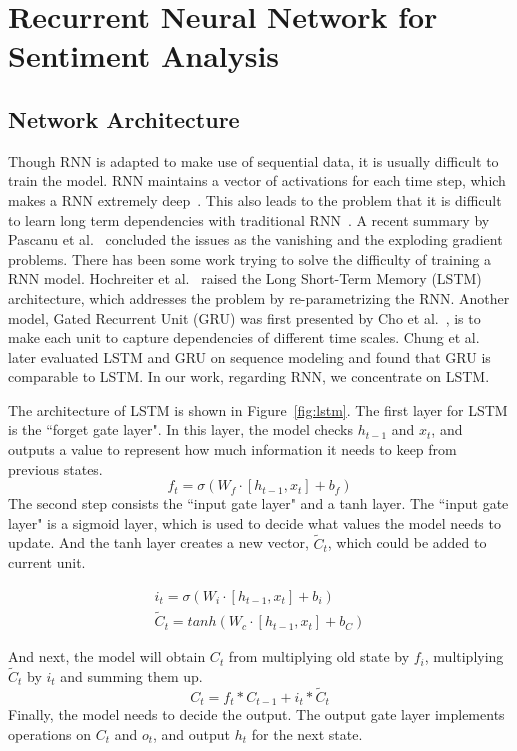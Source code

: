 \section{Recurrent Neural Network for Sentiment Analysis}\label{sec.rnn}

\subsection{Network Architecture}
Though RNN is adapted to make use of sequential data, it is usually difficult to train the model. RNN maintains a vector of activations for each time step, which makes a RNN extremely deep~\cite{jozefowicz2015}. This also leads to the problem that it is difficult to learn long term dependencies with traditional RNN~\cite{bengio1994}. A recent summary by Pascanu et al.~\cite{pascanu2012} concluded the issues as the vanishing and the exploding gradient problems. There has been some work trying to solve the difficulty of training a RNN model. Hochreiter et al.~\cite{hochreiter1997} raised the Long Short-Term Memory (LSTM) architecture, which addresses the problem by re-parametrizing the RNN. Another model, Gated Recurrent Unit (GRU) was first presented by Cho et al.~\cite{cho2014}, is to make each unit to capture dependencies of different time scales. Chung et al.~\cite{chung2014} later evaluated LSTM and GRU on sequence modeling and found that GRU is comparable to LSTM. In our work, regarding RNN, we concentrate on LSTM.

The architecture of LSTM is shown in Figure~\ref{fig:lstm}. The first layer for LSTM is the ``forget gate layer". In this layer, the model checks $h_{t-1}$ and $x_t$, and outputs a value to represent how much information it needs to keep from previous states. 
$$f_t = \sigma (W_f \cdot [h_{t-1}, x_t] + b_f)$$
The second step consists the ``input gate layer" and a tanh layer. The ``input gate layer" is a sigmoid layer, which is used to decide what values the model needs to update. And the tanh layer creates a new vector, $\tilde{C}_t$, which could be added to current unit.
 
\begin{align*}
i_t = \sigma (W_i \cdot [h_{t-1}, x_t] + b_i) \\
\tilde{C}_t = tanh(W_c \cdot [h_{t-1}, x_t] + b_C)
\end{align*}

And next, the model will obtain $C_t$ from multiplying old state by $f_i$, multiplying $\tilde{C}_t$ by $i_t$ and summing them up. 
$$C_t = f_t * C_{t-1} + i_t * \tilde{C}_t$$
Finally, the model needs to decide the output. The output gate layer implements operations on $C_t$ and $o_t$, and output $h_t$ for the next state.


